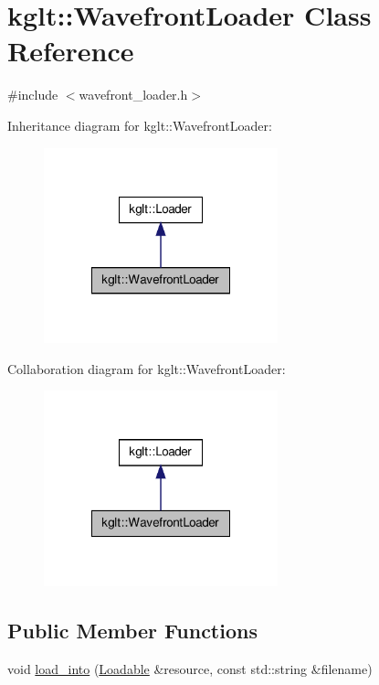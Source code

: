 \hypertarget{classkglt_1_1_wavefront_loader}{\section{kglt\-:\-:Wavefront\-Loader Class Reference}
\label{classkglt_1_1_wavefront_loader}
}


{\ttfamily \#include $<$wavefront\-\_\-loader.\-h$>$}



Inheritance diagram for kglt\-:\-:Wavefront\-Loader\-:\nopagebreak
\begin{figure}[H]
\begin{center}
\leavevmode
\includegraphics[width=192pt]{classkglt_1_1_wavefront_loader__inherit__graph}
\end{center}
\end{figure}


Collaboration diagram for kglt\-:\-:Wavefront\-Loader\-:\nopagebreak
\begin{figure}[H]
\begin{center}
\leavevmode
\includegraphics[width=192pt]{classkglt_1_1_wavefront_loader__coll__graph}
\end{center}
\end{figure}
\subsection*{Public Member Functions}
\begin{DoxyCompactItemize}
\item 
void \hyperlink{classkglt_1_1_wavefront_loader_a7a75f4b9d8cb1591c6f9285528802e05}{load\-\_\-into} (\hyperlink{classkglt_1_1_loadable}{Loadable} \&resource, const std\-::string \&filename)
\end{DoxyCompactItemize}
